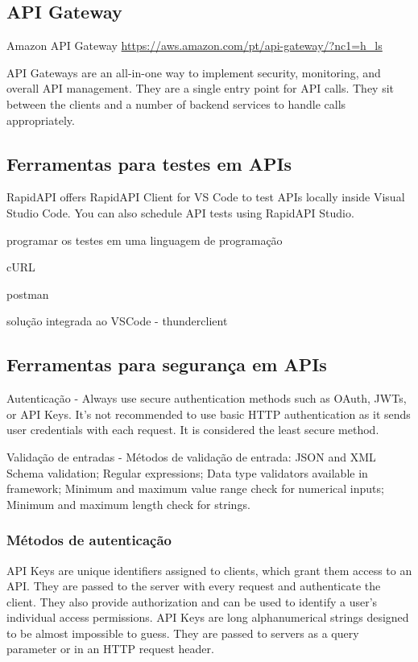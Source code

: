 \subsection{API Gateway}

Amazon API Gateway \url{https://aws.amazon.com/pt/api-gateway/?nc1=h_ls}

API Gateways are an all-in-one way to implement security, monitoring, and overall API management. They are a single entry point for API calls. They sit between the clients and a number of backend services to handle calls appropriately.

\subsection{Ferramentas para testes em APIs}\label{ferramentas-testes-apis}

RapidAPI offers RapidAPI Client for VS Code to test APIs locally inside Visual Studio Code. You can also schedule API tests using RapidAPI Studio.

programar os testes em uma linguagem de programação

cURL

postman

solução integrada ao VSCode - thunderclient

\subsection{Ferramentas para segurança em APIs}

Autenticação - Always use secure authentication methods such as OAuth, JWTs, or API Keys. It's not recommended to use basic HTTP authentication as it sends user credentials with each request. It is considered the least secure method.

Validação de entradas - Métodos de validação de entrada: JSON and XML Schema validation; Regular expressions;  Data type validators available in framework; Minimum and maximum value range check for numerical inputs;  Minimum and maximum length check for strings.

\subsubsection{Métodos de autenticação}

API Keys are unique identifiers assigned to clients, which grant them access to an API. They are passed to the server with every request and authenticate the client. They also provide authorization and can be used to identify a user's individual access permissions. API Keys are long alphanumerical strings designed to be almost impossible to guess. They are passed to servers as a query parameter or in an HTTP request header.

